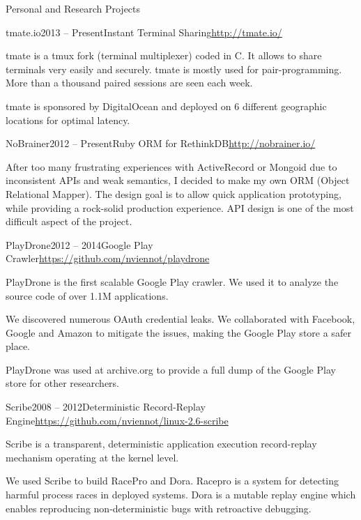 \documentclass{resume} %
\begin{document}
\begin{rSection}{Personal and Research Projects}

\begin{rSubsection}{tmate.io}{2013 -- Present}{Instant Terminal Sharing}{\url{http://tmate.io/}}
\item tmate is a tmux fork (terminal multiplexer) coded in C. It allows to share
  terminals very easily and securely. tmate is mostly used for pair-programming.
      More than a thousand paired sessions are seen each week.
\item tmate is sponsored by DigitalOcean and deployed on 6 different geographic locations for optimal latency.
\end{rSubsection}

\clearpage

\begin{rSubsection}{NoBrainer}{2012 -- Present}{Ruby ORM for RethinkDB}{\url{http://nobrainer.io/}}
\item After too many frustrating experiences with ActiveRecord or Mongoid due to
  inconsistent APIs and weak semantics, I decided to make my own ORM (Object Relational Mapper).
  The design goal is to allow quick application prototyping, while providing a rock-solid production experience.
  API design is one of the most difficult aspect of the project.
\end{rSubsection}

\begin{rSubsection}{PlayDrone}{2012 -- 2014}{Google Play Crawler}{\url{https://github.com/nviennot/playdrone}}
\item PlayDrone is the first scalable Google Play crawler. We used it to analyze the source code of over 1.1M applications.
\item We discovered numerous OAuth credential leaks. We collaborated with Facebook,
    Google and Amazon to mitigate the issues, making the Google Play store a safer place.
\item PlayDrone was used at archive.org to provide a full dump of the Google Play store for other researchers.
\end{rSubsection}

\begin{rSubsection}{Scribe}{2008 -- 2012}{Deterministic Record-Replay Engine}{\url{https://github.com/nviennot/linux-2.6-scribe}}
\item Scribe is a transparent, deterministic application execution record-replay mechanism operating at the kernel level.
\item We used Scribe to build RacePro and Dora. Racepro is a system for detecting harmful process races in deployed systems.
Dora is a mutable replay engine which enables reproducing non-deterministic bugs with retroactive debugging.
\end{rSubsection}


\end{rSection}
\end{document}

